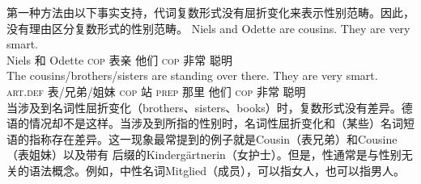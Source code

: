 第一种方法由以下事实支持，代词复数形式没有屈折变化来表示性别范畴。因此，没有理由区分复数形式的性别范畴。
\eal
\ex 
\gll Niels and Odette are cousins. They are very smart.\\
	Niels 和 Odette \textsc{cop} 表亲 他们 \textsc{cop} 非常 聪明\\
\ex 
\gll The cousins/brothers/sisters are standing over there. They are very smart.\\
	\textsc{art}.\textsc{def} 表/兄弟/姐妹 \textsc{cop} 站 \textsc{prep} 那里 他们 \textsc{cop} 非常 聪明\\
\zl
当涉及到名词性屈折变化（brothers、sisters、books）时，复数形式没有差异。德语的情况却不是这样。当涉及到所指的性别时，名词性屈折变化和（某些）名词短语的指称存在差异。这一现象最常提到的例子就是Cousin（表兄弟）和Cousine（表姐妹）以及带有 后缀的Kindergärtnerin（女护士）。但是，性通常是与性别无关的语法概念。例如，中性名词Mitglied（成员），可以指女人，也可以指男人。

